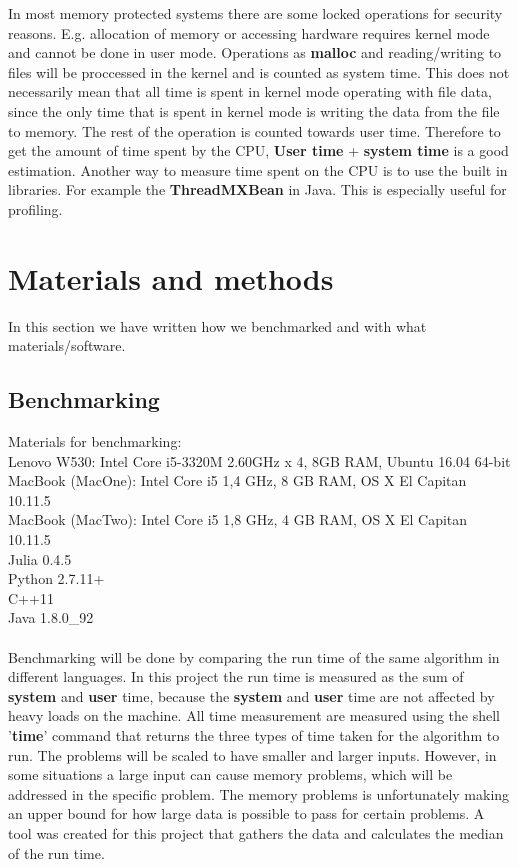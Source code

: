 \documentclass[a4paper, 11pt, titlepage]{article}
\begin{document}
In most memory protected systems there are some locked operations for security reasons. E.g. allocation of memory or accessing hardware requires kernel mode and cannot be done in user mode. Operations as \textbf{malloc} and reading/writing to files will be proccessed in the kernel and is counted as system time. This does not necessarily mean that all time is spent in kernel mode operating with file data, since the only time that is spent in kernel mode is writing the data from the file to memory. The rest of the operation is counted towards user time. Therefore to get the amount of time spent by the CPU, \textbf{User time} + \textbf{system time} is a good estimation. Another way to measure time spent on the CPU is to use the built in libraries. For example the \textbf{ThreadMXBean} in Java. This is especially useful for profiling.

\section{Materials and methods}
In this section we have written how we benchmarked and with what materials/software.
\subsection{Benchmarking}
Materials for benchmarking: \\
Lenovo W530: Intel Core i5-3320M 2.60GHz x 4, 8GB RAM, Ubuntu 16.04 64-bit\\
MacBook (MacOne): Intel Core i5 1,4 GHz, 8 GB RAM, OS X El Capitan 10.11.5\\
MacBook (MacTwo): Intel Core i5 1,8 GHz, 4 GB RAM, OS X El Capitan 10.11.5\\
Julia 0.4.5 \\
Python 2.7.11+ \\
C++11 \\
Java 1.8.0\_92 \\\\
Benchmarking will be done by comparing the run time of the same algorithm in different languages. In this project the run time is measured as the sum of \textbf{system} and \textbf{user} time, because the \textbf{system} and \textbf{user} time are not affected by heavy loads on the machine. All time measurement are measured using the shell '\textbf{time}' command that returns the three types of time taken for the algorithm to run. The problems will be scaled to have smaller and larger inputs. However, in some situations a large input can cause memory problems, which will be addressed in the specific problem. The memory problems is unfortunately making an upper bound for how large data is possible to pass for certain problems. A tool was created for this project that gathers the data and calculates the median of the run time. 
\end{document}
